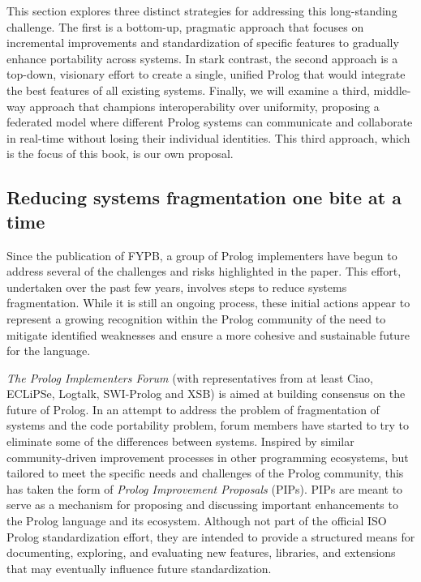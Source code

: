 This section explores three distinct strategies for addressing this long-standing challenge. The first is a bottom-up, pragmatic approach that focuses on incremental improvements and standardization of specific features to gradually enhance portability across systems. In stark contrast, the second approach is a top-down, visionary effort to create a single, unified Prolog that would integrate the best features of all existing systems. Finally, we will examine a third, middle-way approach that champions interoperability over uniformity, proposing a federated model where different Prolog systems can communicate and collaborate in real-time without losing their individual identities. This third approach, which is the focus of this book, is our own proposal.

\subsection{Reducing systems fragmentation one bite at a time}

Since the publication of FYPB, a group of Prolog implementers have begun to address several of the challenges and risks highlighted in the paper. This effort, undertaken over the past few years, involves steps to reduce systems fragmentation. %
While it is still an ongoing process, these initial actions appear to represent a growing recognition within the Prolog community of the need to mitigate identified weaknesses and ensure a more cohesive and sustainable future for the language.

\textit{The Prolog Implementers Forum} (with representatives from at least Ciao, ECLiPSe, Logtalk, SWI-Prolog and XSB) is aimed at building consensus on the future of Prolog. In an attempt to address the problem of fragmentation of systems and the code portability problem, forum members have started to try to eliminate some of the differences between systems. Inspired by similar community-driven improvement processes in other programming ecosystems, but tailored to meet the specific needs and challenges of the Prolog community, this has taken the form of \textit{Prolog Improvement Proposals} (PIPs). PIPs are meant to serve as a mechanism for proposing and discussing important enhancements to the Prolog language and its ecosystem. Although not part of the official ISO Prolog standardization effort, they are intended to provide a structured means for documenting, exploring, and evaluating new features, libraries, and extensions that may eventually influence future standardization. 

